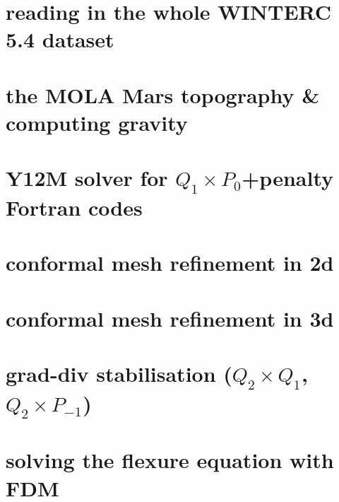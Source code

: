 \documentclass[a4paper,11pt]{report}
\begin{document}
\chapter{reading in the whole WINTERC 5.4 dataset \label{f99}} %

\chapter{the MOLA Mars topography \& computing gravity \label{f100}} %

\chapter{Y12M solver for $Q_1\times P_0$+penalty Fortran codes \label{f101}} %

\chapter{conformal mesh refinement in 2d \label{f102}} %

\chapter{conformal mesh refinement in 3d \label{f103}} %

\chapter{grad-div stabilisation ($Q_2\times Q_1$, $Q_2 \times P_{-1}$) \label{f104}} %

\chapter{solving the flexure equation with FDM  \label{f105}} %
\end{document}
